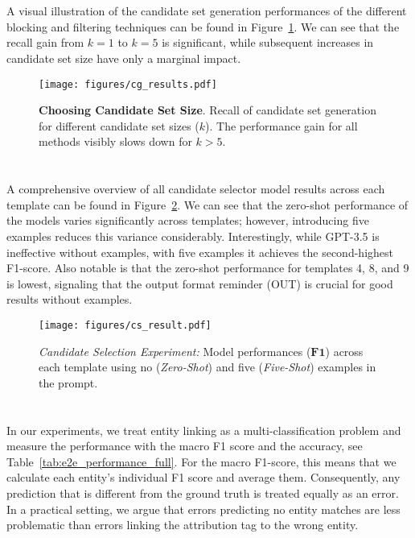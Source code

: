 
\clearpage
\begin{appendix}
\renewcommand{\thesection}{\appendixname~\arabic{section}}
%
%
\section{}  \label{appendix:cg}
A visual illustration of the candidate set generation performances of the different blocking and filtering techniques can be found in Figure~\ref{fig:cg_results}. We can see that the recall gain from $k=1$ to $k=5$ is significant, while subsequent increases in candidate set size have only a marginal impact.

\begin{figure}
    \centering
    \texttt{[image: figures/cg\_results.pdf]}
    \caption{\textbf{Choosing Candidate Set Size}. Recall of candidate set generation for different candidate set sizes ($k$). The performance gain for all methods visibly slows down for $k > 5$.}
    \label{fig:cg_results}
\end{figure}
%
%
\section{} \label{appendix:el}
A comprehensive overview of all candidate selector model results across each template can be found in Figure~\ref{fig:cs_result_full}. We can see that the zero-shot performance of the models varies significantly across templates; however, introducing five examples reduces this variance considerably. Interestingly, while GPT-3.5 is ineffective without examples, with five examples it achieves the second-highest F1-score. Also notable is that the zero-shot performance for templates 4, 8, and 9 is lowest, signaling that the output format reminder (OUT) is crucial for good results without examples.

\begin{figure}
    \centering
    \texttt{[image: figures/cs\_result.pdf]}
    \caption{\emph{Candidate Selection Experiment:} Model performances ($\mathbf{F1}$) across each template using no (\emph{Zero-Shot}) and five (\emph{Five-Shot}) examples in the prompt.}
    \label{fig:cs_result_full}
\end{figure}
%
%
\section{} \label{appendix:e2e}

In our experiments, we treat entity linking as a multi-classification problem and measure the performance with the macro F1 score and the accuracy, see Table~\ref{tab:e2e_performance_full}. For the macro F1-score, this means that we calculate each entity's individual F1 score and average them. Consequently, any prediction that is different from the ground truth is treated equally as an error. In a practical setting, we argue that errors predicting no entity matches are less problematic than errors linking the attribution tag to the wrong entity.


\end{appendix}
